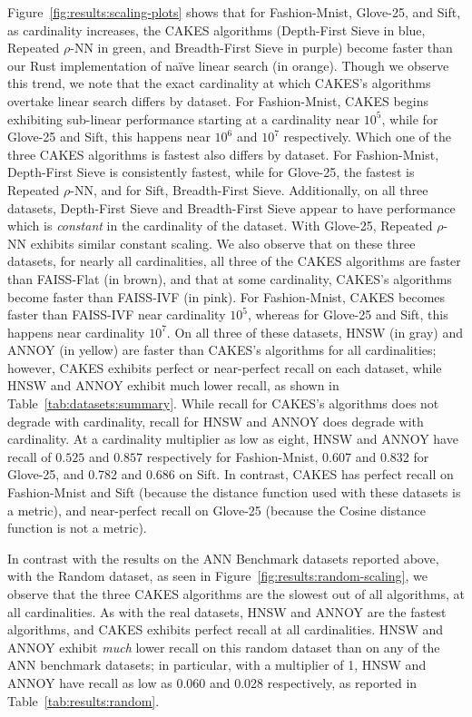 Figure~\ref{fig:results:scaling-plots} shows that for Fashion-Mnist, Glove-25, and Sift, as cardinality increases, the CAKES algorithms (Depth-First Sieve in blue, Repeated $\rho$-NN in green, and Breadth-First Sieve in purple) become faster than our Rust implementation of na\"{i}ve linear search (in orange).
Though we observe this trend, we note that the exact cardinality at which CAKES's algorithms overtake linear search differs by dataset. For Fashion-Mnist, CAKES begins exhibiting sub-linear performance starting at a cardinality near $10^5$, while for Glove-25 and Sift, this happens near $10^6$ and $10^7$ respectively. 
Which one of the three CAKES algorithms is fastest also differs by dataset.
For Fashion-Mnist, Depth-First Sieve is consistently fastest, while for Glove-25, the fastest is Repeated $\rho$-NN, and for Sift, Breadth-First Sieve. 
Additionally, on all three datasets, Depth-First Sieve and Breadth-First Sieve appear to have performance which is \emph{constant} in the cardinality of the dataset. 
With Glove-25, Repeated $\rho$-NN exhibits similar constant scaling. 
We also observe that on these three datasets, for nearly all cardinalities, all three of the CAKES algorithms are faster than FAISS-Flat (in brown), and that at some cardinality, CAKES's algorithms become faster than FAISS-IVF (in pink). 
For Fashion-Mnist, CAKES becomes faster than FAISS-IVF near cardinality $10^5$, whereas for Glove-25 and Sift, this happens near cardinality $10^7$. 
On all three of these datasets, HNSW (in gray) and ANNOY (in yellow) are faster than CAKES's algorithms for all cardinalities; however, CAKES exhibits perfect or near-perfect recall on each dataset, while HNSW and ANNOY exhibit much lower recall, as shown in Table~\ref{tab:datasets:summary}.
While recall for CAKES's algorithms does not degrade with cardinality, recall for HNSW and ANNOY does degrade with cardinality. 
At a cardinality multiplier as low as eight, HNSW and ANNOY have recall of $0.525$ and $0.857$ respectively for Fashion-Mnist, 0.607 and 0.832 for Glove-25, and 0.782 and 0.686 on Sift. 
In contrast, CAKES has perfect recall on Fashion-Mnist and Sift (because the distance function used with these datasets is a metric), and near-perfect recall on Glove-25 (because the Cosine distance function is not a metric).


In contrast with the results on the ANN Benchmark datasets reported above, with the Random dataset, as seen in Figure~\ref{fig:results:random-scaling}, we observe that the three CAKES algorithms are the slowest out of all algorithms, at all cardinalities.
As with the real datasets, HNSW and ANNOY are the fastest algorithms, and CAKES exhibits perfect recall at all cardinalities.
HNSW and ANNOY exhibit \emph{much} lower recall on this random dataset than on any of the ANN benchmark datasets;
in particular, with a multiplier of 1, HNSW and ANNOY have recall as low as 0.060 and 0.028 respectively, as reported in Table~\ref{tab:results:random}.


